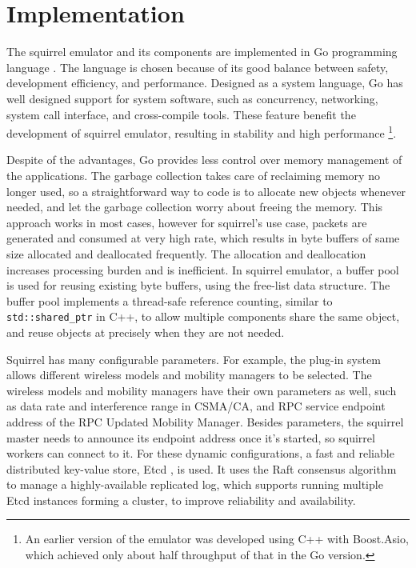 \documentclass[12pt]{report}
\begin{document}
\section{Implementation}
\label{sec:squirrel_implementation}

The squirrel emulator and its components are implemented in Go programming language \cite{golang}. The language is chosen because of its good balance between safety, development efficiency, and performance. Designed as a system language, Go has well designed support for system software, such as concurrency, networking, system call interface, and cross-compile tools. These feature benefit the development of squirrel emulator, resulting in stability and high performance \footnote{An earlier version of the emulator was developed using C++ with Boost.Asio, which achieved only about half throughput of that in the Go version.}.

Despite of the advantages, Go provides less control over memory management of the applications. The garbage collection takes care of reclaiming memory no longer used, so a straightforward way to code is to allocate new objects whenever needed, and let the garbage collection worry about freeing the memory. This approach works in most cases, however for squirrel's use case, packets are generated and consumed at very high rate, which results in byte buffers of same size allocated and deallocated frequently. The allocation and deallocation increases processing burden and is inefficient. In squirrel emulator, a buffer pool is used for reusing existing byte buffers, using the free-list data structure. The buffer pool implements a thread-safe reference counting, similar to \texttt{std::shared\_ptr} in C++, to allow multiple components share the same object, and reuse objects at precisely when they are not needed.

Squirrel has many configurable parameters. For example, the plug-in system allows different wireless models and mobility managers to be selected. The wireless models and mobility managers have their own parameters as well, such as data rate and interference range in CSMA/CA, and RPC service endpoint address of the RPC Updated Mobility Manager. Besides parameters, the squirrel master needs to announce its endpoint address once it's started, so squirrel workers can connect to it. For these dynamic configurations, a fast and reliable distributed key-value store, Etcd \cite{etcd}, is used. It uses the Raft consensus algorithm \cite{ongaro2014search} to manage a highly-available replicated log, which supports running multiple Etcd instances forming a cluster, to improve reliability and availability.
\end{document}
